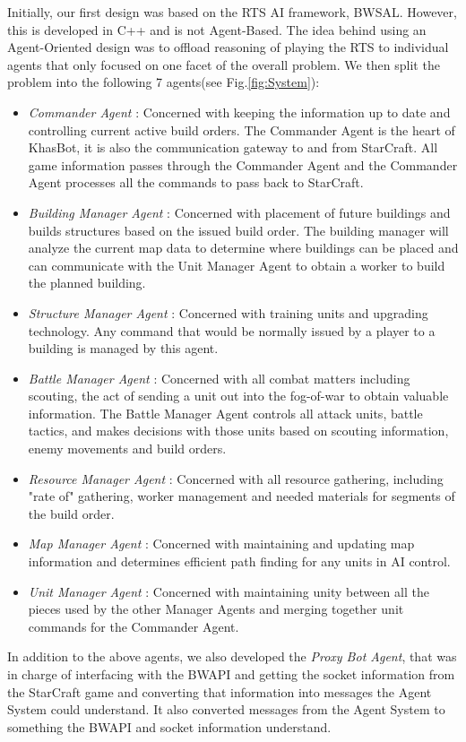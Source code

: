 \documentclass[letterpaper]{article}
\begin{document}
Initially, our first design was based on the RTS AI framework, BWSAL.  However, this is developed in C++ and is not Agent-Based. The idea behind using an Agent-Oriented design was to offload reasoning of playing the RTS to individual agents that only focused on one facet of the overall problem.  We then split the problem into the following 7 agents(see Fig.\ref{fig:System}):
\begin{itemize}
\item \emph{Commander Agent} : Concerned with keeping the information up to date and controlling current active build orders.  The Commander Agent is the heart of KhasBot, it is also the communication gateway to and from StarCraft.  All game information passes through the Commander Agent and the Commander Agent processes all the commands to pass back to StarCraft.
\item \emph{Building Manager Agent} :  Concerned with placement of future buildings and builds structures based on the issued build order.  The building manager will analyze the current map data to determine where buildings can be placed and can communicate with the Unit Manager Agent to obtain a worker to build the planned building.
\item \emph{Structure Manager Agent} : Concerned with training units and upgrading technology.  Any command that would be normally issued by a player to a building is managed by this agent.
\item \emph{Battle Manager Agent} : Concerned with all combat matters including scouting, the act of sending a unit out into the fog-of-war to obtain valuable information.  The Battle Manager Agent controls all attack units, battle tactics, and makes decisions with those units based on scouting information, enemy movements and build orders.
\item \emph{Resource Manager Agent} : Concerned with all resource gathering, including "rate of" gathering, worker management and needed materials for segments of the build order.
\item \emph{Map Manager Agent} : Concerned with maintaining and updating map information and determines efficient path finding for any units in AI control.
\item \emph{Unit Manager Agent} : Concerned with maintaining unity between all the pieces used by the other Manager Agents and merging together unit commands for the Commander Agent.
\end{itemize}

In addition to the above agents, we also developed the \emph{Proxy Bot Agent}, that was in charge of interfacing with the BWAPI and getting the socket information from the StarCraft game and converting that information into messages the Agent System could understand.  It also converted messages from the Agent System to something the BWAPI and socket information understand.
\end{document}
